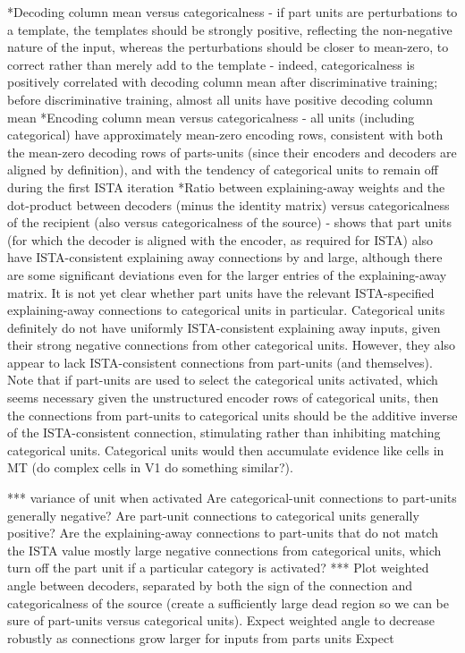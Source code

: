 *Decoding column mean versus categoricalness - if part units are perturbations to a template, the templates should be strongly positive, reflecting the non-negative nature of the input, whereas the perturbations should be closer to mean-zero, to correct rather than merely add to the template - indeed, categoricalness is positively correlated with decoding column mean after discriminative training; before discriminative training, almost all units have positive decoding column mean
*Encoding column mean versus categoricalness - all units (including categorical) have approximately mean-zero encoding rows, consistent with both the mean-zero decoding rows of parts-units (since their encoders and decoders are aligned by definition), and with the tendency of categorical units to remain off during the first ISTA iteration
*Ratio between explaining-away weights and the dot-product between decoders (minus the identity matrix) versus categoricalness of the recipient (also versus categoricalness of the source) - shows that part units (for which the decoder is aligned with the encoder, as required for ISTA) also have ISTA-consistent explaining away connections by and large, although there are some significant deviations even for the larger entries of the explaining-away matrix.  It is not yet clear whether part units have the relevant ISTA-specified explaining-away connections to categorical units in particular.  Categorical units definitely do not have uniformly ISTA-consistent explaining away inputs, given their strong negative connections from other categorical units.  However, they also appear to lack ISTA-consistent connections from part-units (and themselves).  Note that if part-units are used to select the categorical units activated, which seems necessary given the unstructured encoder rows of categorical units, then the connections from part-units to categorical units should be the additive inverse of the ISTA-consistent connection, stimulating rather than inhibiting matching categorical units.  Categorical units would then accumulate evidence like cells in MT (do complex cells in V1 do something similar?).  

*** variance of unit when activated
Are categorical-unit connections to part-units generally negative?  Are part-unit connections to categorical units generally positive?
Are the explaining-away connections to part-units that do not match the ISTA value mostly large negative connections from categorical units, which turn off the part unit if a particular category is activated?
*** Plot weighted angle between decoders, separated by both the sign of the connection and categoricalness of the source (create a sufficiently large dead region so we can be sure of part-units versus categorical units).  Expect weighted angle to decrease robustly as connections grow larger for inputs from parts units
Expect 

